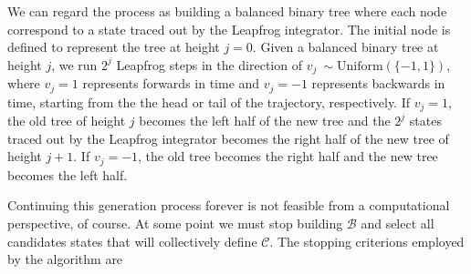 We can regard the process as building a balanced binary tree where each node correspond to a state traced out by the Leapfrog integrator. The initial node is defined to represent the tree at height $j = 0$. Given a balanced binary tree at height $j$, we run $2^j$ Leapfrog steps in the direction of $v_j ~ \sim \text{Uniform}(\{-1, 1\})$, where $v_j = 1$ represents forwards in time and $v_j = -1$ represents backwards in time, starting from the the head or tail of the trajectory, respectively.
If $v_j = 1$, the old tree of height $j$ becomes the left half of the new tree and the $2^j$ states traced out by the Leapfrog integrator becomes the right half of the new tree of height $j + 1$. If $v_j = -1$, the old tree becomes the right half and the new tree becomes the left half. 

Continuing this generation process forever is not feasible from a computational perspective, of course. At some point we must stop building $\mathcal{B}$ and select all candidates states that will collectively define $\mathcal{C}$. The stopping criterions employed by the algorithm are
